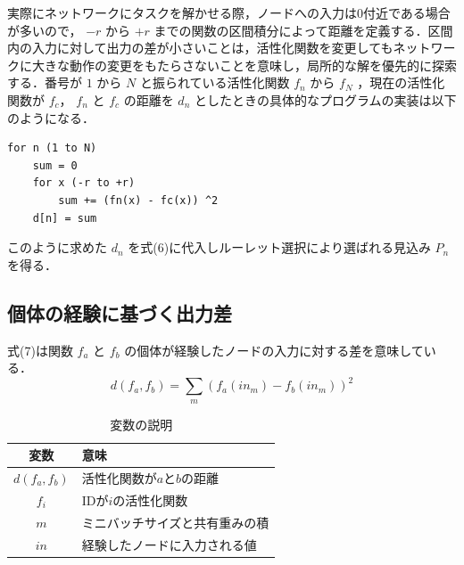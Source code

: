 実際にネットワークにタスクを解かせる際，ノードへの入力は0付近である場合が多いので\cite{ノード入力}， $ -r $ から $ +r $ までの関数の区間積分によって距離を定義する．区間内の入力に対して出力の差が小さいことは，活性化関数を変更してもネットワークに大きな動作の変更をもたらさないことを意味し，局所的な解を優先的に探索する．番号が $ 1 $ から $ N $ と振られている活性化関数 $ f_n $ から $ f_N $ ，現在の活性化関数が $ f_c $， $ f_n $ と $ f_c $ の距離を $ d_n $ としたときの具体的なプログラムの実装は以下のようになる．

\begin{lstlisting}[区間積分差のプログラム]
for n (1 to N)
    sum = 0
    for x (-r to +r)
        sum += (fn(x) - fc(x)) ^2
    d[n] = sum
\end{lstlisting}

このように求めた $ d_n $ を式(6)に代入しルーレット選択により選ばれる見込み $ P_n $ を得る．

\subsection{個体の経験に基づく出力差}
式(7)は関数 $ f_a $ と $ f_b $ の個体が経験したノードの入力に対する差を意味している．
\begin{equation}
    d(f_{a}, f_{b}) = \sum_{m}(f_{a}(in_{m}) - f_{b}(in_{m}))^2
\end{equation}

\begin{table}[H]
    \caption{変数の説明}
    \centering
    \begin{tabular}{cl}
        \hline
        変数  & 意味 \\
        \hline \hline
        $d(f_{a}, f_{b})$ & 活性化関数が$a$と$b$の距離                 \\
        $f_{i}$           & IDが$i$の活性化関数                        \\
        $m$               & ミニバッチサイズと共有重みの積             \\
        $in$              & 経験したノードに入力される値               \\
        \hline
    \end{tabular}
\end{table}

